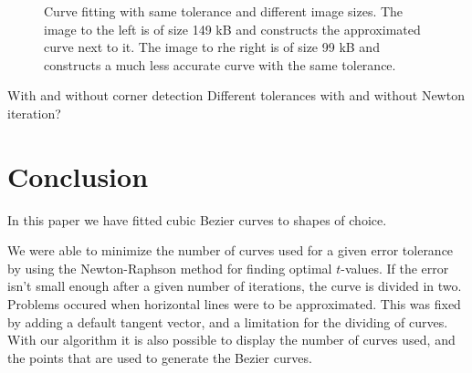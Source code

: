 \documentclass[10pt]{article}
\begin{document}
\begin{figure}
\begin{minipage}[t]{.24\textwidth}
    \label{fig:cornerdet}
\end{minipage}\hfill
\caption{Curve fitting with same tolerance and different image sizes. The image to the left is of size 149 kB and constructs the approximated curve next to it. The image to rhe right is of size 99 kB and constructs a much less accurate curve with the same tolerance.}
\label{fig:mickey}
\end{figure}




With and without corner detection
Different tolerances
with and without Newton iteration?





\section*{Conclusion}
In this paper we have fitted cubic Bezier curves to shapes of choice.

We were able to minimize the number of curves used for a given error tolerance by using the Newton-Raphson method for finding optimal $t$-values. If the error isn't small enough after a given number of iterations, the curve is divided in two. Problems occured when horizontal lines were to be approximated. This was fixed by adding a default tangent vector, and a limitation for the dividing of curves. With our algorithm it is also possible to display the number of curves used, and the points that are used to generate the Bezier curves.


\cite{Plass:1983}


\end{document}
